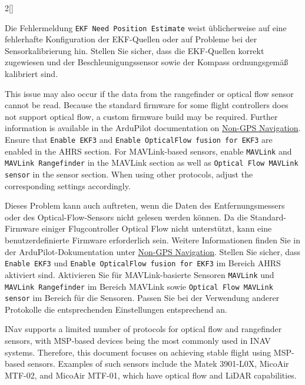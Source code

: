 \begin{paracol}{2}[]
\colger

Die Fehlermeldung \texttt{EKF Need Position Estimate} weist üblicherweise auf eine fehlerhafte Konfiguration der EKF-Quellen oder auf Probleme bei der Sensorkalibrierung hin. Stellen Sie sicher, dass die EKF-Quellen korrekt zugewiesen und der Beschleunigungssensor sowie der Kompass ordnungsgemäß kalibriert sind.

\coleng

This issue may also occur if the data from the rangefinder or optical flow sensor cannot be read. Because the standard firmware for some flight controllers does not support optical flow, a custom firmware build may be required. Further information is available in the ArduPilot documentation on \href{https://ardupilot.org/copter/docs/common-non-gps-navigation-landing-page.html}{Non-GPS Navigation}. Ensure that \verb!Enable EKF3! and \verb!Enable OpticalFlow fusion for EKF3! are enabled in the AHRS section. For MAVLink-based sensors, enable \verb!MAVLink! and \verb!MAVLink Rangefinder! in the MAVLink section as well as \verb!Optical Flow MAVLink sensor! in the sensor section. When using other protocols, adjust the corresponding settings accordingly.

\colger

Dieses Problem kann auch auftreten, wenn die Daten des Entfernungsmessers oder des Optical-Flow-Sensors nicht gelesen werden können. Da die Standard-Firmware einiger Flugcontroller Optical Flow nicht unterstützt, kann eine benutzerdefinierte Firmware erforderlich sein. Weitere Informationen finden Sie in der ArduPilot-Dokumentation unter \href{https://ardupilot.org/copter/docs/common-non-gps-navigation-landing-page.html}{Non-GPS Navigation}. Stellen Sie sicher, dass \verb!Enable EKF3! und \verb!Enable OpticalFlow fusion for EKF3! im Bereich AHRS aktiviert sind. Aktivieren Sie für MAVLink-basierte Sensoren \verb!MAVLink! und \verb!MAVLink Rangefinder! im Bereich MAVLink sowie \verb!Optical Flow MAVLink sensor! im Bereich für die Sensoren. Passen Sie bei der Verwendung anderer Protokolle die entsprechenden Einstellungen entsprechend an.

\colende

\renewcommand{\deutschertitel}{Optischer Fluss und LiDAR Entfernungsmessung (INAV)}
\renewcommand{\englischertitel}{Optical Flow and LiDAR Sensor Configuration (INAV)}
\makrounterabschnitt

INav supports a limited number of protocols for optical flow and rangefinder sensors, with MSP-based devices being the most commonly used in INAV systems. Therefore, this document focuses on achieving stable flight using MSP-based sensors. Examples of such sensors include the Matek 3901-L0X, MicoAir MTF-02, and MicoAir MTF-01, which have optical flow and LiDAR capabilities.


\end{paracol}
